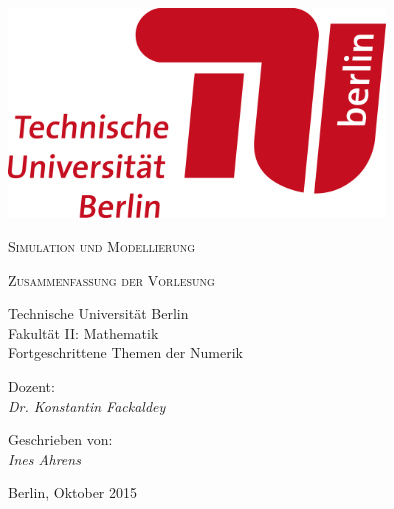 
\thispagestyle{empty}

\vfill
	\begin{center}
			\includegraphics[width=10cm]{images/TU_Logo}
		\par
		\vspace*{8ex}
\Huge
			\textsc{Simulation und Modellierung}
		\par
\normalsize
		\vspace*{8ex}
\large
			\textsc{Zusammenfassung der Vorlesung}\\
		\par
\normalsize
		\vspace*{6ex}
			Technische Universit\"{a}t Berlin\\
			Fakult\"{a}t II: Mathematik\\
			Fortgeschrittene Themen der Numerik
	\end{center}
	\par
	\vspace*{12ex}
		Dozent:\\
\large
			\textit{Dr. Konstantin Fackaldey}
	\par
\normalsize
	\vspace*{2ex}
		Geschrieben von:\\
\large
			\textit{Ines Ahrens}
	\par
\normalsize
	\vspace*{4ex}
		Berlin, Oktober 2015
\vfill
\hspace*{1em}